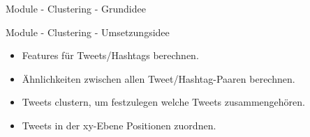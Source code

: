 

\begin{frame}{Module - Clustering - Grundidee}

\end{frame}


\begin{frame}{Module - Clustering - Umsetzungsidee}
\begin{itemize}
 \item Features für Tweets/Hashtags berechnen.
\item Ähnlichkeiten zwischen allen Tweet/Hashtag-Paaren berechnen.
\item Tweets clustern, um festzulegen welche Tweets zusammengehören.
\item Tweets in der xy-Ebene Positionen zuordnen.
\end{itemize}
\end{frame}


